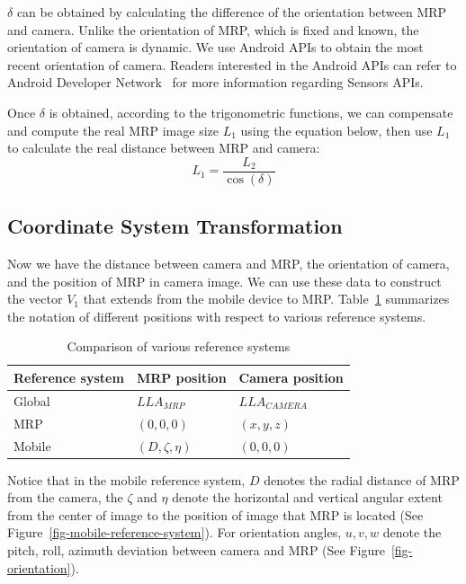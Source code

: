 $\delta$ can be obtained by calculating the difference of the orientation between MRP and camera. Unlike the orientation of MRP, which is fixed and known, the orientation of camera is dynamic. We use Android APIs to obtain the most recent orientation of camera. Readers interested in the Android APIs can refer to Android Developer Network~\cite{android-sensors-apis} for more information regarding Sensors APIs.

Once $\delta$ is obtained, according to the trigonometric functions, we can compensate and compute the real MRP image size \emph{$L_1$} using the equation below, then use \emph{$L_1$} to calculate the real distance between MRP and camera:
\[L_1 = \frac{{L_2}}{{\cos (\delta )}}\]

\subsection{Coordinate System Transformation}
Now we have the distance between camera and MRP, the orientation of camera, and the position of MRP in camera image. We can use these data to construct the vector \emph{$V_1$} that extends from the mobile device to MRP. Table~\ref{tb-comare-reference-system} summarizes the notation of different positions with respect to various reference systems.
\begin{table}
\begin{center}
\vspace{-20pt}
    \begin{tabular}{ | l | l | l | }
    \hline
    Reference system & MRP position & Camera position\\ \hline\hline
    Global & $LLA_{MRP}$ & $LLA_{CAMERA}$\\ \hline
    MRP & $(0,0,0)$ & $(x,y,z)$\\ \hline
    Mobile & $(D,\zeta,\eta)$ & $(0,0,0)$\\ \hline
    \end{tabular}
\end{center}
\vspace{-15pt}
\caption{Comparison of various reference systems}\label{tb-comare-reference-system}
\vspace{-15pt}
\end{table} 

Notice that in the mobile reference system, $D$ denotes the radial distance of MRP from the camera, the $\zeta$ and $\eta$ denote the horizontal and vertical angular extent from the center of image to the position of image that MRP is located (See Figure~\ref{fig-mobile-reference-system}). For orientation angles, $u,v,w$ denote the pitch, roll, azimuth deviation between camera and MRP (See Figure~\ref{fig-orientation}).


